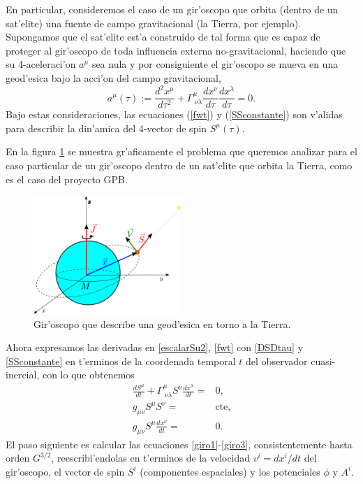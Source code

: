 En particular, consideremos el caso de un gir'oscopo que orbita (dentro de un sat'elite) una fuente de campo gravitacional (la Tierra, por ejemplo). Supongamos que el sat'elite est'a construido de tal forma que es capaz de proteger al gir'oscopo de toda influencia externa no-gravitacional, haciendo que su 4-aceleraci'on $a^\mu $ sea nula y por consiguiente el gir'oscopo se mueva en una geod'esica bajo la acci'on del campo gravitacional,
\begin{equation}
a^\mu (\tau):=\frac{d^2x^\mu }{d\tau^2}+\Gamma^\mu _{\ \nu\lambda}\frac{dx^{\nu}}{d\tau}\frac{dx^{\lambda}}{d\tau}=0.
\end{equation}
Bajo estas consideraciones,  las ecuaciones (\ref{fwt}) y (\ref{SSconstante}) son v'alidas para describir la din'amica del 4-vector de spin $S^{\mu}(\tau)$.

En la figura \ref{GPB} se muestra gr'aficamente el problema que queremos analizar para el caso particular de un gir'oscopo dentro de un sat'elite que orbita la Tierra, como es el caso del proyecto GPB.
\begin{figure}[H]
\centering
\includegraphics[angle=0,width=0.5\textwidth]{fig/fig-GPB.pdf}
\caption{Gir'oscopo que describe una geod'esica en torno a la Tierra.}
\label{GPB}
\end{figure}
Ahora expresamos las derivadas en \eqref{escalarSu2}, \eqref{fwt} con \eqref{DSDtau} y  \eqref{SSconstante} en t'erminos de la coordenada temporal $t$ del observador cuasi-inercial, con lo que obtenemos 
\begin{align}
\frac{dS^\mu }{dt}+\Gamma^\mu _{\ \nu\lambda}S^{\nu}\frac{dx^{\lambda}}{dt}={}&0,\label{giro1}\\
g_{\mu\nu}S^\mu S^{\nu}={}&\text{cte},\label{giro2}\\
g_{\mu\nu}S^\mu \frac{dx^{\nu}}{dt}={}&0.\label{giro3}
\end{align}
El paso siguiente es calcular las ecuaciones \eqref{giro1}-\eqref{giro3}, consistentemente hasta orden $G^{3/2}$, reescribi'endolas en t'erminos de la velocidad $v^i=dx^i/dt$ del gir'oscopo, el vector de spin $S^i$ (componentes espaciales) y los potenciales $\phi$ y $A^i$.

